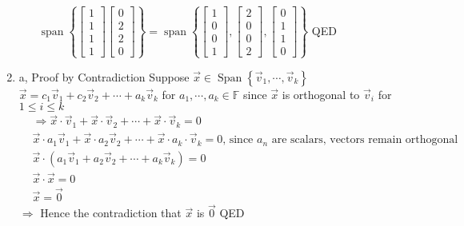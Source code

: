 \documentclass[11pt]{article}
\begin{document}
\begin{enumerate}[{\bf Q1.}]
\begin{enumerate}
			$\operatorname{span}\left\{\left[\begin{array}{l}1 \\ 1 \\ 1 \\ 1\end{array}\right]\left[\begin{array}{l}0 \\ 2 \\ 2 \\ 0\end{array}\right]\right\}=\operatorname{span}\left\{\left[\begin{array}{l}1 \\ 0 \\ 0 \\ 1\end{array}\right],\left[\begin{array}{l}2 \\ 0 \\ 0 \\ 2\end{array}\right],\left[\begin{array}{l}0 \\ 1 \\ 1 \\ 0\end{array}\right]\right\}$
			QED

	\end{enumerate}
	
	\newpage
	
	\item
	\begin{enumerate}
		a, Proof by Contradiction \newline
		Suppose $\vec{x} \in \operatorname{Span}\left\{\vec{v}_1, \cdots, \vec{v}_k\right\}$
		$\vec{x}=c_1 \vec{v}_1+c_2 \vec{v}_2+\cdots+a_k \vec{v}_k$ for $a_1, \cdots, a_k \in \mathbb{F}$ \newline
		since $\vec{x}$ is orthogonal to $\vec{v}_i$ for $1 \leqslant i \leqslant k$
		$$
		\begin{aligned}
		& \Rightarrow \vec{x} \cdot \vec{v}_1+\vec{x} \cdot \vec{v}_2+\cdots+\vec{x} \cdot \vec{v}_k=0 \\
		& \vec{x} \cdot a_1 \vec{v}_1+\vec{x} \cdot a_2 \vec{v}_2+\cdots+\vec{x} \cdot a_k \cdot \vec{v}_k=0 \text {, since } a_n \text { are scalars, vectors remain orthogonal } \\
		& \vec{x} \cdot\left(a_1 \vec{v}_1+a_2 \vec{v}_2+\cdots+a_k \vec{v}_k\right)=0 \\
		& \vec{x} \cdot \vec{x}=0 \\
		& \vec{x}=\overrightarrow{0}
		\end{aligned}
		$$
		$\Rightarrow$ Hence the contradiction that $\vec{x}$ is $\overrightarrow{0}$ \newline
		QED
		

\end{enumerate}
\end{enumerate}
\end{document}
